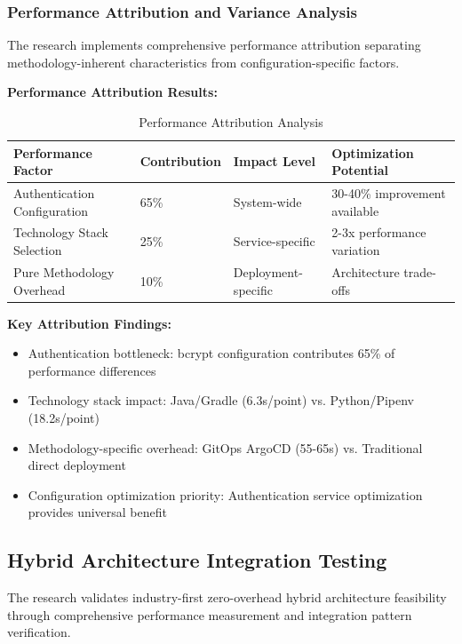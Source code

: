 \subsubsection{Performance Attribution and Variance Analysis}

The research implements comprehensive performance attribution separating methodology-inherent characteristics from configuration-specific factors.

\textbf{Performance Attribution Results:}
\begin{table}[H]
\centering
\caption{Performance Attribution Analysis}
\label{tab:performance-attribution}
\begin{tabular}{|p{4cm}|p{3cm}|p{3cm}|p{4cm}|}
\hline
\textbf{Performance Factor} & \textbf{Contribution} & \textbf{Impact Level} & \textbf{Optimization Potential} \\
\hline
Authentication Configuration & 65\% & System-wide & 30-40\% improvement available \\
\hline
Technology Stack Selection & 25\% & Service-specific & 2-3x performance variation \\
\hline
Pure Methodology Overhead & 10\% & Deployment-specific & Architecture trade-offs \\
\hline
\end{tabular}
\end{table}

\textbf{Key Attribution Findings:}
\begin{itemize}
\item Authentication bottleneck: bcrypt configuration contributes 65\% of performance differences
\item Technology stack impact: Java/Gradle (6.3s/point) vs. Python/Pipenv (18.2s/point)
\item Methodology-specific overhead: GitOps ArgoCD (55-65s) vs. Traditional direct deployment
\item Configuration optimization priority: Authentication service optimization provides universal benefit
\end{itemize}

\subsection{Hybrid Architecture Integration Testing}

The research validates industry-first zero-overhead hybrid architecture feasibility through comprehensive performance measurement and integration pattern verification.

